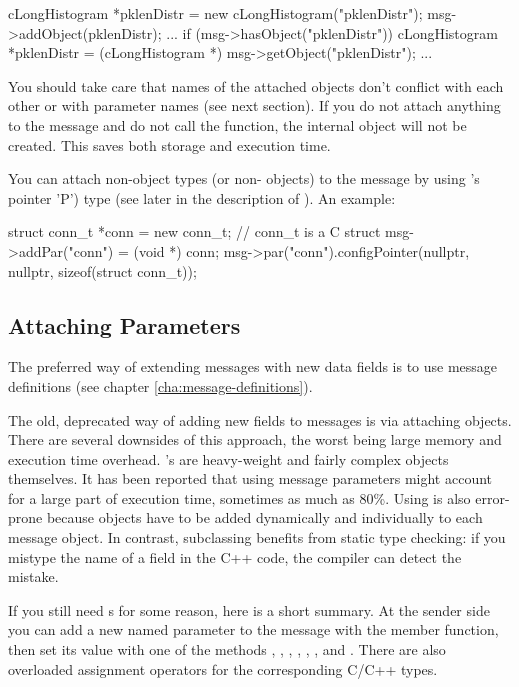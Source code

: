 \begin{cpp}
cLongHistogram *pklenDistr = new cLongHistogram("pklenDistr");
msg->addObject(pklenDistr);
...
if (msg->hasObject("pklenDistr"))
{
   cLongHistogram *pklenDistr =
       (cLongHistogram *) msg->getObject("pklenDistr");
   ...
}
\end{cpp}

You should take care that names of the attached objects don't
conflict with each other or with  parameter names
(see next section).
If you do not attach anything to the message and do not call the
 function, the internal  object
will not be created. This saves both storage and execution time.

You can attach non-object types (or non- objects) to
the message by using
's  pointer 'P') type (see later in the description
of ). An example:

\begin{cpp}
struct conn_t *conn = new conn_t; // conn_t is a C struct
msg->addPar("conn") = (void *) conn;
msg->par("conn").configPointer(nullptr, nullptr, sizeof(struct conn_t));
\end{cpp}


\subsection{Attaching Parameters}

The preferred way of extending messages with new data fields is to use
message definitions (see chapter \ref{cha:message-definitions}).

The old, deprecated way of adding new fields to messages is via
attaching  objects.
There are several downsides of this approach, the worst being
large memory and execution time overhead. 's are
heavy-weight and fairly complex objects themselves.
It has been reported that using  message parameters
might account for a large part of execution time, sometimes as much as 80\%.
Using  is also error-prone because  objects
have to be added dynamically and individually to each message object.
In contrast, subclassing benefits from static type checking:
if you mistype the name of a field in the C++ code, the compiler
can detect the mistake.

If you still need s for some reason, here is a short summary.
At the sender side you can add a new named parameter to the message
with the  member function, then set its value with
one of the methods , ,
, , ,
, and . There are also overloaded
assignment operators for the corresponding C/C++ types.

